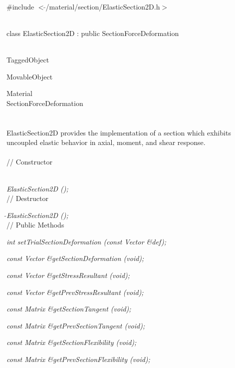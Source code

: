 
   \\
\#include $<\tilde{ }$/material/section/ElasticSection2D.h$>$  


  \\
class ElasticSection2D : public SectionForceDeformation 


 \\
TaggedObject 

MovableObject 

\indent\indent Material \\
\indent\indent\indent SectionForceDeformation \\
\indent\indent\indent{} \\

  \\
\indent ElasticSection2D provides the implementation of a
section which exhibits uncoupled elastic behavior in axial, moment,
and shear response. \\

 \\
// Constructor 

 \\ 
{\em ElasticSection2D ();} \\ 

// Destructor 

{\em $\tilde{ }$ElasticSection2D ();} \\ 

// Public Methods 

{\em int setTrialSectionDeformation (const Vector \&def); } 

{\em const Vector \&getSectionDeformation (void); } 

{\em const Vector \&getStressResultant (void); } 

{\em const Vector \&getPrevStressResultant (void); } 

{\em const Matrix \&getSectionTangent (void); } 

{\em const Matrix \&getPrevSectionTangent (void); } 

{\em const Matrix \&getSectionFlexibility (void); } 

{\em const Matrix \&getPrevSectionFlexibility (void); } 

